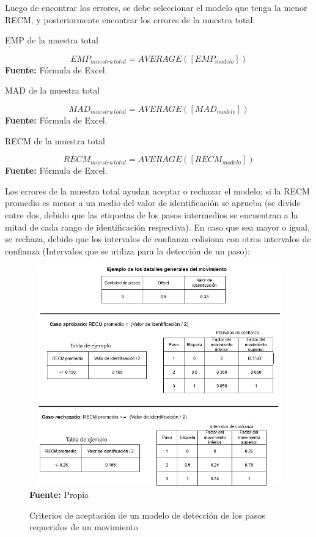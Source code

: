 Luego de encontrar los errores, se debe seleccionar el modelo que tenga la menor \acrshort{RECM}, y posteriormente encontrar los errores de la muestra total:
 \begin{formula}[H]
	\centering
	\caption{EMP de la muestra total}
	\label{frm:EmpAll}
	\begin{equation}
EMP_{muestra\, total}=AVERAGE([EMP_{modelo}])
	\end{equation}
	\textbf{Fuente:} F\'ormula de Excel.
\end{formula}  
 \begin{formula}[H]
	\centering
	\caption{MAD de la muestra total}
	\label{frm:MadAll}
	\begin{equation}
MAD_{muestra\, total}=AVERAGE([MAD_{modelo}])
	\end{equation}
	\textbf{Fuente:} F\'ormula de Excel.
\end{formula}  
	 \begin{formula}[H]
	\centering
	\caption{RECM de la muestra total}
	\label{frm:RecmAll}
	\begin{equation}
RECM_{muestra\, total}=AVERAGE([RECM_{modelo}])
	\end{equation}
	\textbf{Fuente:} F\'ormula de Excel.
\end{formula} 
Los errores de la muestra total ayudan aceptar o rechazar el modelo; si la \acrshort{RECM} promedio  es menor a un medio del valor de identificaci\'on se aprueba (se divide entre dos, debido que las etiquetas de los pasos intermedios se encuentran a la mitad de cada rango de identificaci\'on respectiva). En caso que sea mayor o igual, se rechaza, debido que los intervalos de confianza colisiona con otros intervalos de confianza (Intervalos que se utiliza para la detecci\'on de un paso):
\begin{figure}[H]
	\caption{Criterios de aceptaci\'on de un modelo de detecci\'on de los pasos requeridos de un movimiento}
	\label{fig:AproveOrDennie}
	\centering
	\includegraphics[width=430px,height=360px]{graphics/CriterioAceptacion.png} \\
	\textbf{Fuente:} Propia
\end{figure}
